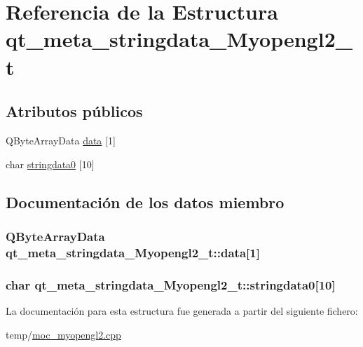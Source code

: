 \hypertarget{structqt__meta__stringdata___myopengl2__t}{}\section{Referencia de la Estructura qt\+\_\+meta\+\_\+stringdata\+\_\+\+Myopengl2\+\_\+t}
\label{structqt__meta__stringdata___myopengl2__t}
\subsection*{Atributos públicos}
\begin{DoxyCompactItemize}
\item 
Q\+Byte\+Array\+Data \hyperlink{structqt__meta__stringdata___myopengl2__t_a9282dc2fc27b06340425780c9c7f7760}{data} \mbox{[}1\mbox{]}
\item 
char \hyperlink{structqt__meta__stringdata___myopengl2__t_a62a6867d5eda2ca164c20378294ce0ce}{stringdata0} \mbox{[}10\mbox{]}
\end{DoxyCompactItemize}


\subsection{Documentación de los datos miembro}
\subsubsection[{\texorpdfstring{data}{data}}]{\setlength{\rightskip}{0pt plus 5cm}Q\+Byte\+Array\+Data qt\+\_\+meta\+\_\+stringdata\+\_\+\+Myopengl2\+\_\+t\+::data\mbox{[}1\mbox{]}}\hypertarget{structqt__meta__stringdata___myopengl2__t_a9282dc2fc27b06340425780c9c7f7760}{}\label{structqt__meta__stringdata___myopengl2__t_a9282dc2fc27b06340425780c9c7f7760}
\subsubsection[{\texorpdfstring{stringdata0}{stringdata0}}]{\setlength{\rightskip}{0pt plus 5cm}char qt\+\_\+meta\+\_\+stringdata\+\_\+\+Myopengl2\+\_\+t\+::stringdata0\mbox{[}10\mbox{]}}\hypertarget{structqt__meta__stringdata___myopengl2__t_a62a6867d5eda2ca164c20378294ce0ce}{}\label{structqt__meta__stringdata___myopengl2__t_a62a6867d5eda2ca164c20378294ce0ce}


La documentación para esta estructura fue generada a partir del siguiente fichero\+:\begin{DoxyCompactItemize}
\item 
temp/\hyperlink{moc__myopengl2_8cpp}{moc\+\_\+myopengl2.\+cpp}\end{DoxyCompactItemize}
